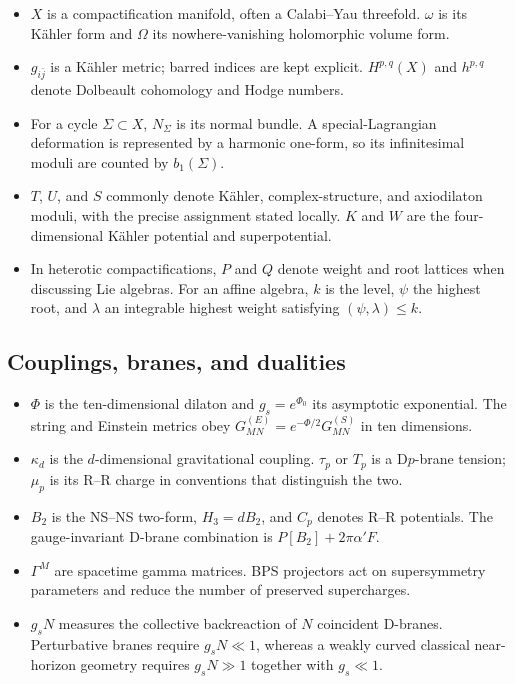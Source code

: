 \documentclass[
  10pt,
  a4paper,
  openany]{book}
\providecommand{\tightlist}{%
  \setlength{\itemsep}{0pt}\setlength{\parskip}{0pt}}
\begin{document}
\begin{itemize}
\tightlist
\item
  \(X\) is a compactification manifold, often a Calabi--Yau threefold.
  \(\omega\) is its Kähler form and \(\Omega\) its nowhere-vanishing
  holomorphic volume form.
\item
  \(g_{i\bar j}\) is a Kähler metric; barred indices are kept explicit.
  \(H^{p,q}(X)\) and \(h^{p,q}\) denote Dolbeault cohomology and Hodge
  numbers.
\item
  For a cycle \(\Sigma\subset X\), \(N_\Sigma\) is its normal bundle. A
  special-Lagrangian deformation is represented by a harmonic one-form,
  so its infinitesimal moduli are counted by \(b_1(\Sigma)\).
\item
  \(T\), \(U\), and \(S\) commonly denote Kähler, complex-structure, and
  axiodilaton moduli, with the precise assignment stated locally. \(K\)
  and \(W\) are the four-dimensional Kähler potential and
  superpotential.
\item
  In heterotic compactifications, \(P\) and \(Q\) denote weight and root
  lattices when discussing Lie algebras. For an affine algebra, \(k\) is
  the level, \(\psi\) the highest root, and \(\lambda\) an integrable
  highest weight satisfying \((\psi,\lambda)\le k\).
\end{itemize}

\subsection{Couplings, branes, and
dualities}\label{couplings-branes-and-dualities}

\begin{itemize}
\tightlist
\item
  \(\Phi\) is the ten-dimensional dilaton and \(g_s=e^{\Phi_0}\) its
  asymptotic exponential. The string and Einstein metrics obey
  \(G^{(E)}_{MN}=e^{-\Phi/2}G^{(S)}_{MN}\) in ten dimensions.
\item
  \(\kappa_d\) is the \(d\)-dimensional gravitational coupling.
  \(\tau_p\) or \(T_p\) is a D\(p\)-brane tension; \(\mu_p\) is its R--R
  charge in conventions that distinguish the two.
\item
  \(B_2\) is the NS--NS two-form, \(H_3=dB_2\), and \(C_p\) denotes R--R
  potentials. The gauge-invariant D-brane combination is
  \(P[B_2]+2\pi\alpha'F\).
\item
  \(\Gamma^M\) are spacetime gamma matrices. BPS projectors act on
  supersymmetry parameters and reduce the number of preserved
  supercharges.
\item
  \(g_sN\) measures the collective backreaction of \(N\) coincident
  D-branes. Perturbative branes require \(g_sN\ll1\), whereas a weakly
  curved classical near-horizon geometry requires \(g_sN\gg1\) together
  with \(g_s\ll1\).
\end{itemize}
\end{document}
